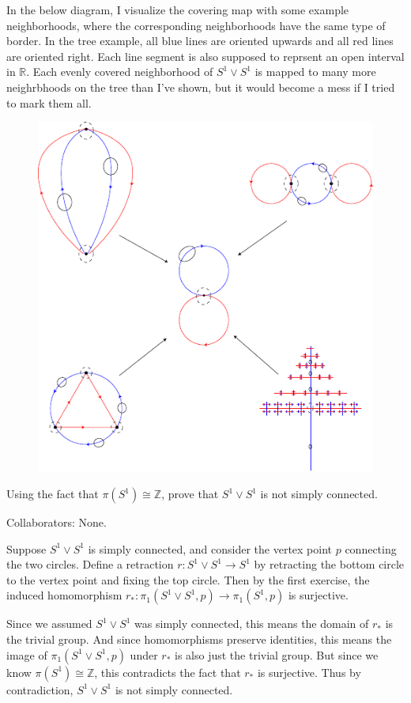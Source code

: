 \documentclass[twoside,10pt]{report}
\begin{document}
In the below diagram, I visualize the covering map with some example neighborhoods, where the corresponding neighborhoods have the same type of border. In the tree example, all blue lines are oriented upwards and all red lines are oriented right. Each line segment is also supposed to reprsent an open interval in $\mathbb{R}$. Each evenly covered neighborhood of $S^1\vee S^1$ is mapped to many more neighrbhoods on the tree than I've shown, but it would become a mess if I tried to mark them all.

\begin{figure}[H]
	\centering
	\includegraphics[scale=1.3]{fig/covers.pdf}
\end{figure}

\pagebreak
\begin{exer}[]
	Using the fact that $\pi(S^1)\cong \mathbb{Z}$, prove that $S^1\vee S^1$ is not simply connected.
\end{exer}
{\color{blue}Collaborators: None.}

Suppose $S^1\vee S^1$ is simply connected, and consider the vertex point $p$ connecting the two circles. Define a retraction $r:S^1\vee S^1\to S^1$ by retracting the bottom circle to the vertex point and fixing the top circle. Then by the first exercise, the induced homomorphism $r_{*}:\pi_1(S^1\vee S^1,p)\to \pi_1(S^1,p)$ is surjective.

Since we assumed $S^1\vee S^1$ was simply connected, this means the domain of $r_{*}$ is the trivial group. And since homomorphisms preserve identities, this means the image of $\pi_1(S^1\vee S^1,p)$ under $r_{*}$ is also just the trivial group. But since we know $\pi(S^1)\cong \mathbb{Z}$, this contradicts the fact that $r_{*}$ is surjective. Thus by contradiction, $S^1\vee S^1$ is not simply connected.
\end{document}
